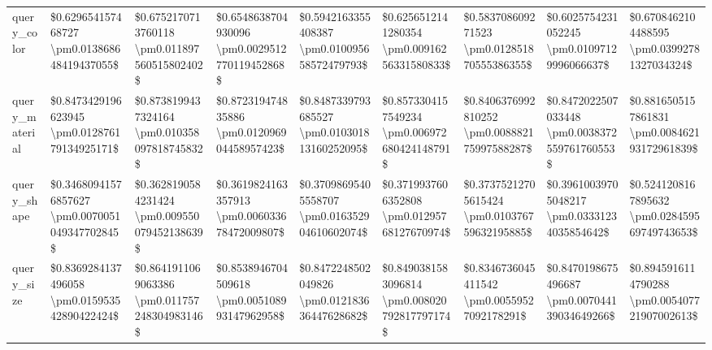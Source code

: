 \begin{tabular}{lllllllll}
query\_color    &     \$0.629654157468727 \textbackslash pm0.013868648419437055\$ &  \$0.6752170713760118 \textbackslash pm0.011897560515802402\$ &  \$0.6548638704930096 \textbackslash pm0.0029512770119452868\$ &   \$0.5942163355408387 \textbackslash pm0.010095658572479793\$ &    \$0.6256512141280354 \textbackslash pm0.00916256331580833\$ &    \$0.583708609271523 \textbackslash pm0.012851870555386355\$ &    \$0.6025754231052245 \textbackslash pm0.01097129996066637\$ &   \$0.6708462104488595 \textbackslash pm0.03992781327034324\$ \\
query\_material &    \$0.8473429196623945 \textbackslash pm0.012876179134925171\$ &  \$0.8738199437324164 \textbackslash pm0.010358097818745832\$ &    \$0.872319474835886 \textbackslash pm0.012096904458957423\$ &   \$0.8487339793685527 \textbackslash pm0.010301813160252095\$ &   \$0.8573304157549234 \textbackslash pm0.006972680424148791\$ &   \$0.8406376992810252 \textbackslash pm0.008882175997588287\$ &  \$0.8472022507033448 \textbackslash pm0.0038372559761760553\$ &  \$0.8816505157861831 \textbackslash pm0.008462193172961839\$ \\
query\_shape    &  \$0.34680941576857627 \textbackslash pm0.0070051049347702845\$ &  \$0.3628190584231424 \textbackslash pm0.009550079452138639\$ &   \$0.3619824163357913 \textbackslash pm0.006033678472009807\$ &  \$0.37098695405558707 \textbackslash pm0.016352904610602074\$ &    \$0.3719937606352808 \textbackslash pm0.01295768127670974\$ &  \$0.37375212705615424 \textbackslash pm0.010376759632195885\$ &   \$0.39610039705048217 \textbackslash pm0.03331234035854642\$ &  \$0.5241208167895632 \textbackslash pm0.028459569749743653\$ \\
query\_size     &    \$0.8369284137496058 \textbackslash pm0.015953542890422424\$ &  \$0.8641911069063386 \textbackslash pm0.011757248304983146\$ &   \$0.8538946704509618 \textbackslash pm0.005108993147962958\$ &   \$0.8472248502049826 \textbackslash pm0.012183636447628682\$ &   \$0.8490381583096814 \textbackslash pm0.008020792817797174\$ &    \$0.8346736045411542 \textbackslash pm0.00559527092178291\$ &   \$0.8470198675496687 \textbackslash pm0.007044139034649266\$ &  \$0.8945916114790288 \textbackslash pm0.005407721907002613\$ \\
\bottomrule
\end{tabular}

